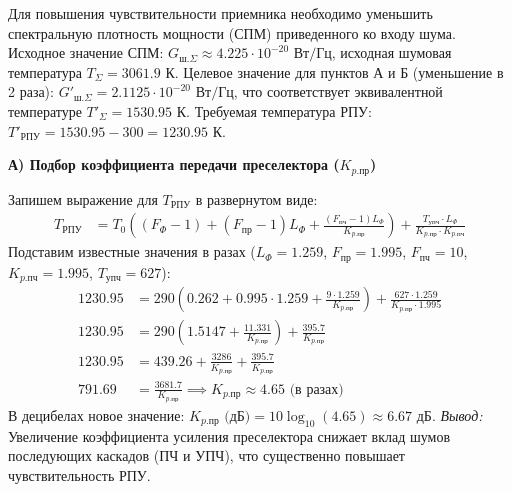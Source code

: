 Для повышения чувствительности приемника необходимо уменьшить спектральную плотность мощности (СПМ) приведенного ко входу шума. Исходное значение СПМ: $G_{ш.\Sigma} \approx 4.225 \cdot 10^{-20} \text{ Вт/Гц}$, исходная шумовая температура $T_{\Sigma} = 3061.9 \text{ К}$. 
Целевое значение для пунктов А и Б (уменьшение в 2 раза): 
$G'_{ш.\Sigma} = 2.1125 \cdot 10^{-20} \text{ Вт/Гц}$, что соответствует эквивалентной температуре $T'_{\Sigma} = 1530.95 \text{ К}$. 
Требуемая температура РПУ: $T'_{\text{РПУ}} = 1530.95 - 300 = 1230.95 \text{ К}$.

\textbf{А) Подбор коэффициента передачи преселектора ($K_{p.\text{пр}}$)}

Запишем выражение для $T_{\text{РПУ}}$ в развернутом виде:
\begin{align*}
T_{\text{РПУ}} &= T_0 \left( (F_{\Phi} - 1) + (F_{\text{пр}} - 1)L_{\Phi} + \frac{(F_{\text{пч}} - 1)L_{\Phi}}{K_{p.\text{пр}}} \right) + \frac{T_{\text{упч}} \cdot L_{\Phi}}{K_{p.\text{пр}} \cdot K_{p.\text{пч}}}
\end{align*}
Подставим известные значения в разах ($L_{\Phi}=1.259$, $F_{\text{пр}}=1.995$, $F_{\text{пч}}=10$, $K_{p.\text{пч}}=1.995$, $T_{\text{упч}}=627$):
\begin{align*}
1230.95 &= 290 \left( 0.262 + 0.995 \cdot 1.259 + \frac{9 \cdot 1.259}{K_{p.\text{пр}}} \right) + \frac{627 \cdot 1.259}{K_{p.\text{пр}} \cdot 1.995} \\
1230.95 &= 290 \left( 1.5147 + \frac{11.331}{K_{p.\text{пр}}} \right) + \frac{395.7}{K_{p.\text{пр}}} \\
1230.95 &= 439.26 + \frac{3286}{K_{p.\text{пр}}} + \frac{395.7}{K_{p.\text{пр}}} \\
791.69 &= \frac{3681.7}{K_{p.\text{пр}}} \implies K_{p.\text{пр}} \approx 4.65 \text{ (в разах)}
\end{align*}
В децибелах новое значение: $K_{p.\text{пр}} \text{ (дБ)} = 10 \log_{10}(4.65) \approx 6.67 \text{ дБ}$.
\textit{Вывод:} Увеличение коэффициента усиления преселектора снижает вклад шумов последующих каскадов (ПЧ и УПЧ), что существенно повышает чувствительность РПУ.

\begin{center}
\end{center}

